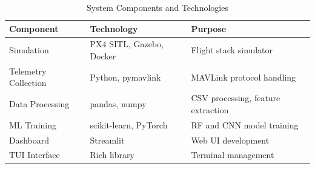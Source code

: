 \begin{table}[htbp]
    \centering
    \caption{System Components and Technologies}
    \label{tab:components}
    \begin{tabular}{|l|l|l|}
        \hline
        \textbf{Component} & \textbf{Technology} & \textbf{Purpose} \\
        \hline
        Simulation & PX4 SITL, Gazebo, Docker & Flight stack simulator \\
        \hline
        Telemetry Collection & Python, pymavlink & MAVLink protocol handling \\
        \hline
        Data Processing & pandas, numpy & CSV processing, feature extraction \\
        \hline
        ML Training & scikit-learn, PyTorch & RF and CNN model training \\
        \hline
        Dashboard & Streamlit & Web UI development \\
        \hline
        TUI Interface & Rich library & Terminal management \\
        \hline
    \end{tabular}
\end{table}